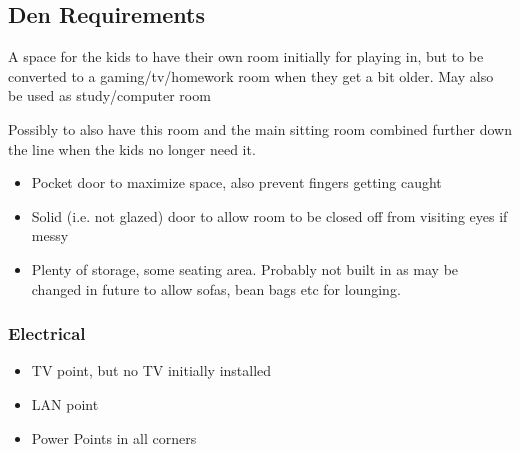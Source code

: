 \subsection{Den Requirements}
A space for the kids to have their own room initially for playing in, but to be converted to a gaming/tv/homework room
when they get a bit older. May also be used as study/computer room

Possibly to also have this room and the main sitting room combined further down the line when the kids no longer need it.
\begin{itemize}
\item Pocket door to maximize space, also prevent fingers getting caught
\item Solid (i.e. not glazed) door to allow room to be closed off from visiting eyes if messy
\item Plenty of storage, some seating area. Probably not built in as may be changed in future to allow sofas, bean bags etc for lounging.
\end{itemize}


\subsubsection{Electrical}
\begin{itemize}
\item TV point, but no TV initially installed
\item LAN point
\item Power Points in all corners
\end{itemize}
